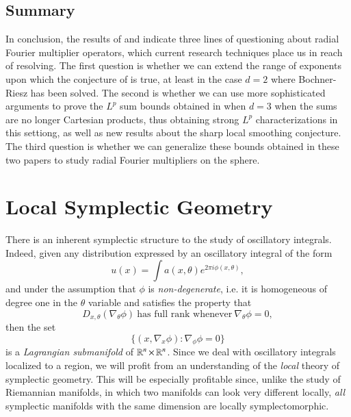\section{Summary}

In conclusion, the results of \cite{HeoandNazarovandSeeger} and \cite{Cladek} indicate three lines of questioning about radial Fourier multiplier operators, which current research techniques place us in reach of resolving. The first question is whether we can extend the range of exponents upon which the conjecture of \cite{GarrigosandSeeger} is true, at least in the case $d = 2$ where Bochner-Riesz has been solved. The second is whether we can use more sophisticated arguments to prove the $L^p$ sum bounds obtained in \cite{Cladek} when $d = 3$ when the sums are no longer Cartesian products, thus obtaining strong $L^p$ characterizations in this settiong, as well as new results about the sharp local smoothing conjecture. The third question is whether we can generalize these bounds obtained in these two papers to study radial Fourier multipliers on the sphere. 








\chapter{Local Symplectic Geometry}

There is an inherent symplectic structure to the study of oscillatory integrals. Indeed, given any distribution expressed by an oscillatory integral of the form
%
\[ u(x) = \int a(x,\theta) e^{2 \pi i \phi(x,\theta)}, \]
%
and under the assumption that $\phi$ is \emph{non-degenerate}, i.e. it is homogeneous of degree one in the $\theta$ variable and satisfies the property that
%
\[ D_{x,\theta}(\nabla_\theta \phi)\ \text{has full rank whenever}\ \nabla_\theta \phi = 0, \]%
then the set
%
\[ \{ (x,\nabla_x \phi): \nabla_\phi \phi = 0 \} \]
%
is a \emph{Lagrangian submanifold} of $\operatorname{\mathbb{R}}^n \times \operatorname{\mathbb{R}}^n$. Since we deal with oscillatory integrals localized to a region, we will profit from an understanding of the \emph{local} theory of symplectic geometry. This will be especially profitable since, unlike the study of Riemannian manifolds, in which two manifolds can look very different locally, \emph{all} symplectic manifolds with the same dimension are locally symplectomorphic.

